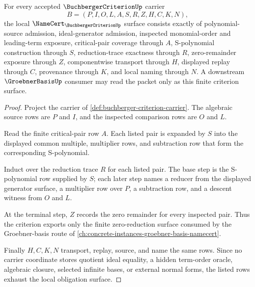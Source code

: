 \begin{theorem}
\label{thm:buchberger-criterion-obligation-surface}
For every accepted $\BuchbergerCriterionUp$ carrier
$$
B=(P,I,O,L,A,S,R,Z,H,C,K,N),
$$
the local $\NameCert_{\BuchbergerCriterionUp}$ surface consists exactly of polynomial-source admission, ideal-generator admission, inspected monomial-order and leading-term exposure, critical-pair coverage through $A$, S-polynomial construction through $S$, reduction-trace exactness through $R$, zero-remainder exposure through $Z$, componentwise transport through $H$, displayed replay through $C$, provenance through $K$, and local naming through $N$. A downstream $\GroebnerBasisUp$ consumer may read the packet only as this finite criterion surface.
\end{theorem}
\begin{proof}
Project the carrier of \autoref{def:buchberger-criterion-carrier}. The algebraic source rows are $P$ and $I$, and the inspected comparison rows are $O$ and $L$.

Read the finite critical-pair row $A$. Each listed pair is expanded by $S$ into the displayed common multiple, multiplier rows, and subtraction row that form the corresponding S-polynomial.

Induct over the reduction trace $R$ for each listed pair. The base step is the S-polynomial row supplied by $S$; each later step names a reducer from the displayed generator surface, a multiplier row over $P$, a subtraction row, and a descent witness from $O$ and $L$.

At the terminal step, $Z$ records the zero remainder for every inspected pair. Thus the criterion exports only the finite zero-reduction surface consumed by the Groebner-basis route of \autoref{ch:concrete-instances-groebner-basis-namecert}.

Finally $H,C,K,N$ transport, replay, source, and name the same rows. Since no carrier coordinate stores quotient ideal equality, a hidden term-order oracle, algebraic closure, selected infinite bases, or external normal forms, the listed rows exhaust the local obligation surface.
\end{proof}

